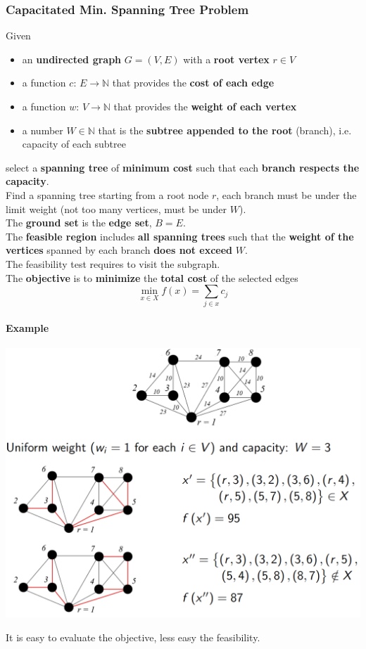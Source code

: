 \newpage

\subsubsection{Capacitated Min. Spanning Tree Problem}
Given
\begin{itemize}
	\item an \textbf{undirected graph} $G = (V , E )$ with a \textbf{root vertex} $r \in V$
	\item a function $c : \, E \rightarrow \mathbb{N}$ that provides the \textbf{cost of each edge}
	\item a function $w : \, V \rightarrow \mathbb{N}$ that provides the \textbf{weight of each vertex}
	\item a number $W \in \mathbb{N}$ that is the \textbf{subtree appended to the root} (branch), i.e. capacity of each subtree
\end{itemize}
select a \textbf{spanning tree} of \textbf{minimum cost} such that each \textbf{branch respects the capacity}.\\
Find a spanning tree starting from a root node $r$, each branch must be under the limit weight (not too many vertices, must be under $W$).\\

The \textbf{ground set} is the \textbf{edge set}, $B = E$.\\

The \textbf{feasible region} includes \textbf{all spanning trees} such that the \textbf{weight of the vertices} spanned by each branch \textbf{does not exceed} $W$.\\
The feasibility test requires to visit the subgraph.\\

The \textbf{objective} is to \textbf{minimize} the \textbf{total cost} of the selected edges
$$ \min_{x \in X} f(x) = \sum_{j \in x} c_j $$

\newpage

\paragraph{Example}
\begin{center}
	\includegraphics[width=0.8\columnwidth]{img/CSTP}
\end{center}
It is easy to evaluate the objective, less easy the feasibility.

